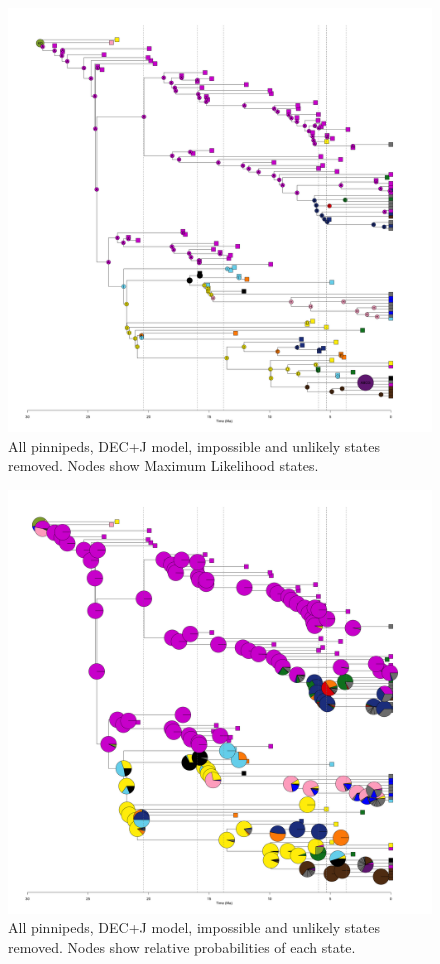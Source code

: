 \documentclass[a4paper, 12pt]{article}
\begin{document}
\begin{figure}[H]
 \centering
  \includegraphics[width = \linewidth]{figures/all-pinnipeds-DECj-unlikely-MLstates.png}
  \caption{All pinnipeds, DEC+J model, impossible and unlikely states removed. Nodes show Maximum Likelihood states.}
  \label{fig-all-decj-ml-unlikely}
\end{figure} 

\begin{figure}[H]
 \centering
  \includegraphics[width = \linewidth]{figures/all-pinnipeds-DECj-unlikely-pies.png}
  \caption{All pinnipeds, DEC+J model, impossible and unlikely states removed. Nodes show relative probabilities of each state.}
  \label{fig-all-decj-pie-unlikely}
\end{figure} 
\end{document}
